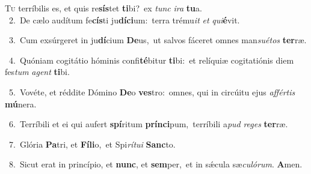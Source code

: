 \lettrine{\initial\textcolor{\initialcolor}{T}}{u} terríbilis es, et quis re\-\textbf{sís}\-tet \textbf{ti}\-bi?~\star ex \textit{tunc} \textit{i}\-\textit{ra} \textbf{tu}\-a.\\
{\numbfont\textcolor{\numbcolor}{~2.}}~De cælo audítum fe\-\textbf{cís}\-ti ju\-\textbf{dí}\-\textbf{ci}um:~\star terra trému\textit{it} \textit{et} \textit{qui}\-\textbf{é}vit.\par
{\numbfont\textcolor{\numbcolor}{~3.}}~Cum exsúrgeret in ju\-\textbf{dí}\-cium \textbf{De}\-us,~\star ut salvos fáceret omnes man\-\textit{su}\-\textit{é}\textit{tos} \textbf{ter}\-ræ.\par
{\numbfont\textcolor{\numbcolor}{~4.}}~Quóniam cogitátio hóminis confi\-\textbf{té}\-bitur \textbf{ti}\-bi:~\star et relíquiæ cogitatiónis diem fes\textit{tum} \textit{a}\-\textit{gent} \textbf{ti}\-bi.\par
{\numbfont\textcolor{\numbcolor}{~5.}}~Vovéte, et réddite Dómino \textbf{De}\-o \textbf{ves}\-tro:~\star omnes, qui in circúitu ejus \textit{af}\-\textit{fér}\textit{tis} \textbf{mú}\-nera.\par
{\numbfont\textcolor{\numbcolor}{~6.}}~Terríbili et ei qui aufert \textbf{spí}\-ritum \textbf{prín}\-\textbf{ci}pum,~\star terríbili a\textit{pud} \textit{re}\-\textit{ges} \textbf{ter}\-ræ.\par
{\numbfont\textcolor{\numbcolor}{~7.}}~Glória \textbf{Pa}\-tri, et \textbf{Fí}\-\textbf{li}o,~\star et Spi\-\textit{rí}\-\textit{tu}\textit{i} \textbf{Sanc}\-to.\par
{\numbfont\textcolor{\numbcolor}{~8.}}~Sicut erat in princípio, et \textbf{nunc}\-, et \textbf{sem}\-per,~\star et in sǽcula sæ\-\textit{cu}\-\textit{ló}\textit{rum}. \textbf{A}\-men.\par
